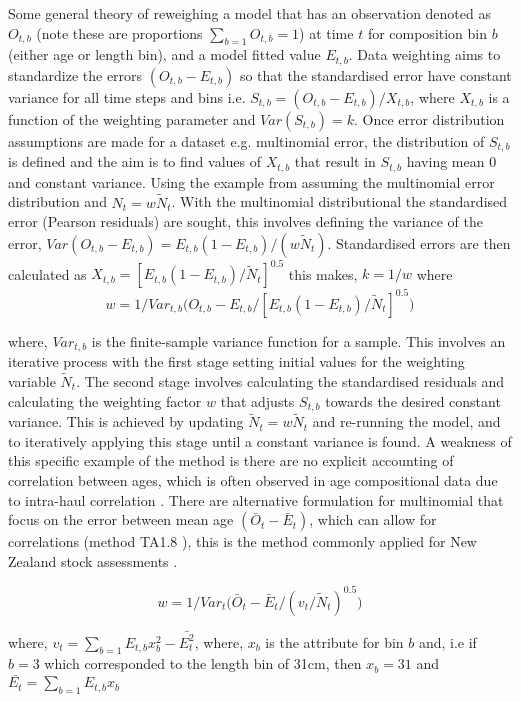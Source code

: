 \documentclass[12pt,preprint,authoryear]{article}
\begin{document}
Some general theory of reweighing a model that has an observation denoted as $O_{t,b}$ (note these are proportions \(\sum_{b = 1}O_{t,b} = 1 \)) at time $t$ for composition bin $b$ (either age or length bin), and a model fitted value $E_{t,b}$. Data weighting aims to standardize the errors $(O_{t,b} - E_{t,b})$ so that the standardised error have constant variance for all time steps and bins i.e. $S_{t,b} = (O_{t,b} - E_{t,b}) /X_{t,b}$, where $X_{t,b}$ is a function of the weighting parameter and $Var(S_{t,b}) = k$. Once error distribution assumptions are made for a dataset e.g. multinomial error, the distribution of $S_{t,b}$ is defined and the aim is to find values of $X_{t,b}$ that result in  $S_{t,b}$ having mean 0 and constant variance.  Using the example from \cite{mcallister1997bayesian} assuming the multinomial error distribution and $N_t = w\tilde{N}_t$. With the multinomial distributional the standardised error (Pearson residuals) are sought, this involves defining the variance of the error, $Var(O_{t,b} - E_{t,b}) = E_{t,b}(1 - E_{t,b})/(w \tilde{N}_t)$. Standardised errors are then calculated as $X_{t,b} =  \left[E_{t,b}(1 - E_{t,b}) / \tilde{N}_t\right]^{0.5}$ this makes, $k = 1/w$ where 
\[
w = 1/ Var_{t,b}\bigg(O_{t,b} - E_{t,b} / \left[E_{t,b}(1 - E_{t,b}) / \tilde{N}_t\right]^{0.5}\bigg)
\]

where, $Var_{t,b}$ is the finite-sample variance function for a sample. This involves an iterative process with the first stage setting initial values for the weighting variable $\tilde{N}_t$. The second stage involves calculating the standardised residuals and calculating the weighting factor $w$ that adjusts $S_{t,b}$ towards the desired constant variance. This is achieved by updating $\tilde{N}_t = w\tilde{N}_t$ and re-running the model, and to iteratively applying this stage until a constant variance is found. A weakness of this specific example of the method is there are no explicit accounting of correlation between ages, which is often observed in age compositional data due to intra-haul correlation \citep{pennington1994assessing}. There are alternative formulation for multinomial that focus on the error between mean age $(\bar{O}_{t} - \bar{E}_{t})$, which can allow for correlations (method TA1.8 \cite{francis2011data}), this is the method commonly applied for New Zealand stock assessments \citep{plenary_14}.

\begin{equation}\label{eq:meth_18}
w = 1/ Var_{t}\bigg(\bar{O}_{t} - \bar{E}_{t} / \left(v_t /\tilde{N}_t  \right)^{0.5}\bigg)
\end{equation}

where, \(v_t = \sum_{b = 1} E_{t,b}x_b^2 - \bar{E_t^2}\), where, \(x_b\) is the attribute for bin \(b\) and, i.e if \(b = 3\) which corresponded to the length bin of 31cm, then \(x_b = 31\) and \(\bar{E_t} = \sum_{b = 1}  E_{t,b}x_b \)


\end{document}
